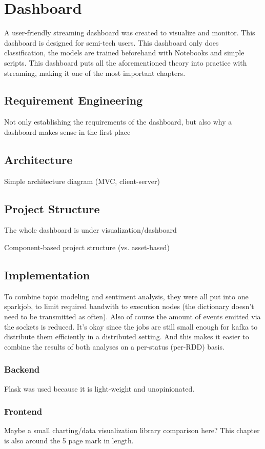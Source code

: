\chapter{Dashboard}

\label{ch:dashboard}

A user-friendly streaming dashboard was created to visualize and monitor.
This dashboard is designed for semi-tech users.
This dashboard only does classification, the models are trained beforehand with Notebooks and simple scripts.
This dashboard puts all the aforementioned theory into practice with streaming, making it one of the most important chapters.

\section{Requirement Engineering}
\label{sec:requirementEngineering}

Not only establishing the requirements of the dashboard, but also why a dashboard makes sense in the first place

\section{Architecture}
\label{sec:architecture}

Simple architecture diagram (MVC, client-server)

\section{Project Structure}
\label{sec:projectStructure}

The whole dashboard is under visualization/dashboard

Component-based project structure (vs. asset-based)

\section{Implementation}
\label{sec:implementation}

To combine topic modeling and sentiment analysis, they were all put into one sparkjob, to limit required bandwith to execution nodes (the dictionary doesn't need to be transmitted as often).
Also of course the amount of events emitted via the sockets is reduced.
It's okay since the jobs are still small enough for kafka to distribute them efficiently in a distributed setting.
And this makes it easier to combine the results of both analyses on a per-status (per-RDD) basis.

\subsection{Backend}
\label{subsec:backend}

Flask was used because it is light-weight and unopinionated.

\subsection{Frontend}
\label{subsec:frontend}

Maybe a small charting/data visualization library comparison here?
This chapter is also around the 5 page mark in length.
\pagebreak[5]